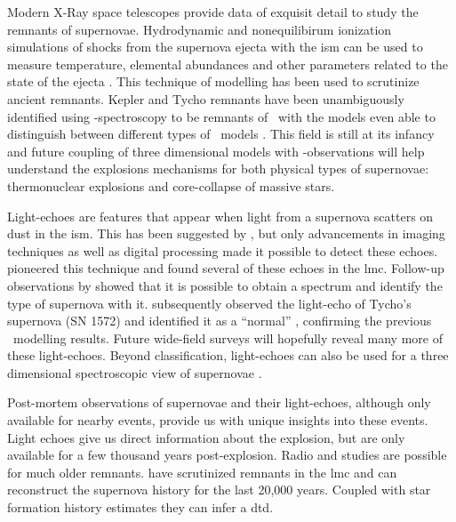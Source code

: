 Modern X-Ray space telescopes provide data of exquisit detail to study the remnants of supernovae. Hydrodynamic and nonequilibirum ionization simulations of shocks from the supernova ejecta with the \gls{ism} can be used to measure temperature, elemental abundances and other parameters related to the state of the ejecta \citep{2003ApJ...593..358B, 2004AstL...30..737S, 2005ApJ...624..198B}. This technique of modelling has been used to scrutinize ancient remnants. Kepler and Tycho remnants have been unambiguously identified using \xray-spectroscopy to be remnants of \sneia\  with the models even able to distinguish between different types of \snia\ models \citep{2006ApJ...645.1373B, 2007ApJ...668L.135R}. This field is still at its infancy and future coupling of three dimensional models with \xray-observations will help understand the explosions mechanisms for both physical types of supernovae: thermonuclear explosions and core-collapse of massive stars. 

Light-echoes are features that appear when light from a supernova scatters on dust in the \gls{ism}. This has been suggested by \citet{1940RvMP...12...66Z}, but only advancements in imaging techniques as well as digital processing made it possible to detect these echoes. \cite{2005Natur.438.1132R} pioneered this technique and found several of these echoes in the \gls{lmc}. Follow-up observations by \cite{2008ApJ...680.1137R} showed that it is possible to obtain a spectrum and identify the type of supernova with it. 
\cite{2008Natur.456..617K} subsequently observed the light-echo of Tycho's supernova (SN 1572) and identified it as a ``normal'' \snia, confirming the previous \xray\ modelling results. Future wide-field surveys will hopefully reveal many more of these light-echoes. Beyond classification, light-echoes can also be used for a three dimensional spectroscopic view of supernovae \citep[demonstrated on the example of  remnant. see][]{2011ApJ...732....3R}.

Post-mortem observations of supernovae and their light-echoes, although only available for nearby events, provide us with unique insights into these events.  Light echoes give us direct information about the explosion, but are only available for a few thousand years post-explosion. Radio and \xray studies are possible for much older remnants.  \citet{2010MNRAS.407.1314M} have scrutinized remnants in the \gls{lmc} and can reconstruct the supernova history for the last 20,000 years. Coupled with star formation history estimates they can infer a \gls{dtd}.


